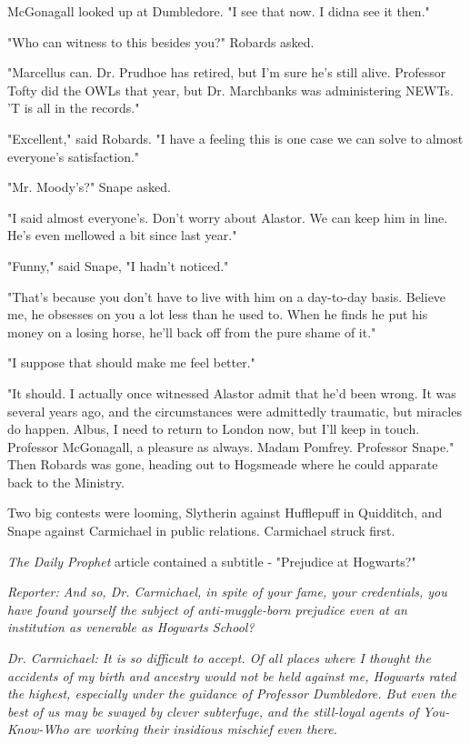 McGonagall looked up at Dumbledore. "I see that now. I didna see it then."

"Who can witness to this besides you?" Robards asked.

"Marcellus can. Dr. Prudhoe has retired, but I'm sure he's still alive. Professor Tofty did the OWLs that year, but Dr. Marchbanks was administering NEWTs. 'T is all in the records."

"Excellent," said Robards. "I have a feeling this is one case we can solve to almost everyone's satisfaction."

"Mr. Moody's?" Snape asked.

"I said almost everyone's. Don't worry about Alastor. We can keep him in line. He's even mellowed a bit since last year."

"Funny," said Snape, "I hadn't noticed."

"That's because you don't have to live with him on a day-to-day basis. Believe me, he obsesses on you a lot less than he used to. When he finds he put his money on a losing horse, he'll back off from the pure shame of it."

"I suppose that should make me feel better."

"It should. I actually once witnessed Alastor admit that he'd been wrong. It was several years ago, and the circumstances were admittedly traumatic, but miracles do happen. Albus, I need to return to London now, but I'll keep in touch. Professor McGonagall, a pleasure as always. Madam Pomfrey. Professor Snape." Then Robards was gone, heading out to Hogsmeade where he could apparate back to the Ministry.

Two big contests were looming, Slytherin against Hufflepuff in Quidditch, and Snape against Carmichael in public relations. Carmichael struck first.

\emph{The Daily Prophet} article contained a subtitle - "Prejudice at Hogwarts?"

\emph{Reporter: And so, Dr. Carmichael, in spite of your fame, your credentials, you have found yourself the subject of anti-muggle-born prejudice even at an institution as venerable as Hogwarts School?}

\emph{Dr. Carmichael: It is so difficult to accept. Of all places where I thought the accidents of my birth and ancestry would not be held against me, Hogwarts rated the highest, especially under the guidance of Professor Dumbledore. But even the best of us may be swayed by clever subterfuge, and the still-loyal agents of You-Know-Who are working their insidious mischief even there.}

